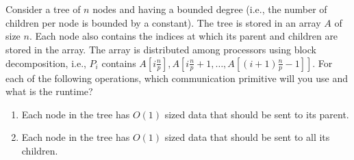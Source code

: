 \documentclass{article}
\begin{document}
\section{}
Consider a tree of $n$ nodes and having a bounded degree (i.e., the number of children per node is bounded by a constant).
The tree is stored in an array $A$ of size $n$.
Each node also contains the indices at which its parent and children are stored in the array.
The array is distributed among processors using block decomposition, i.e., $P_i$ contains $A[i\frac{n}{p}],A[i\frac{n}{p} + 1, \dots, A[(i + 1)\frac{n}{p} - 1]].$
For each of the following operations, which communication primitive will you use and what is the runtime?

\begin{enumerate}[label=(\alph*)]
  \item Each node in the tree has $O(1)$ sized data that should be sent to its parent.
  \item Each node in the tree has $O(1)$ sized data that should be sent to all its children.
\end{enumerate}
\end{document}
